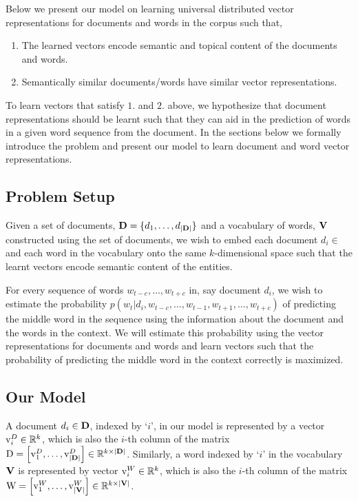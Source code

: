 Below we present our model on learning universal distributed vector representations for documents and words in the corpus such that,
\begin{enumerate}
\item The learned vectors encode semantic and topical content of the documents and words.
\item Semantically similar documents/words have similar vector representations.
\end{enumerate}
To learn vectors that satisfy $1.$ and $2.$ above, we hypothesize that document representations should be learnt such that they can aid in the prediction of words in a given word sequence from the document. In the sections below we formally introduce the problem and present our model to learn document and word vector representations.

\subsection{Problem Setup}
Given a set of documents, $\mathbf{D}=\{d_{1}, \ldots, d_{|\mathbf{D}|}\}$ and a vocabulary of words, $\mathbf{V}$ constructed using the set of documents, we wish to embed each document $d_{i} \in$ \setD and each word in the vocabulary onto the same $k$-dimensional space such that the learnt vectors encode semantic content of the entities. 

For every sequence of words $w_{t-c}, \ldots, w_{t+c}$ in, say document $d_{i}$, we wish to estimate the probability $p(w_{t}|d_{i}, w_{t-c}, \ldots, w_{t-1}, w_{t+1}, \ldots, w_{t+c})$ of predicting the middle word in the sequence using the information about the document and the words in the context. 
We will estimate this probability using the vector representations for documents and words and learn vectors such that the probability of predicting the middle word in the context correctly is maximized.

\subsection{Our Model}
A document $d_{i} \in \mathbf{D}$, indexed by `$i$', in our model is represented by a vector $\mathrm{v}^{D}_{i} \in \mathbb{R}^{k}$, which is also the $i$-th column of the matrix $\mathrm{D} = \left[\mathrm{v}^{D}_{1}, \ldots, \mathrm{v}^{D}_{|\mathbf{D}|}\right] \in \mathbb{R}^{k \times |\mathbf{D}|}$. 
Similarly, a word indexed by `$i$' in the vocabulary $\mathbf{V}$ is represented by vector $\mathrm{v}^{W}_{i} \in \mathbb{R}^{k}$, which is also the $i$-th column of the matrix $\mathrm{W} = \left[\mathrm{v}^{W}_{1}, \ldots, \mathrm{v}^{W}_{|\mathbf{V}|}\right] \in \mathbb{R}^{k \times |\mathbf{V}|}$.


